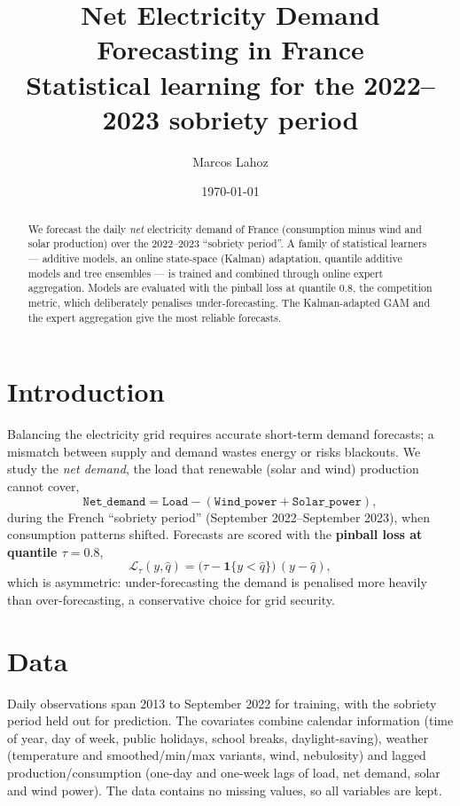 \documentclass[11pt,a4paper]{article}
\title{\textbf{Net Electricity Demand Forecasting in France}\\
\large Statistical learning for the 2022--2023 sobriety period}
\author{Marcos Lahoz}
\date{\today}
\begin{document}
\maketitle

\begin{abstract}
We forecast the daily \emph{net} electricity demand of France (consumption minus
wind and solar production) over the 2022--2023 ``sobriety period''. A family of
statistical learners --- additive models, an online state-space (Kalman) adaptation,
quantile additive models and tree ensembles --- is trained and combined through online
expert aggregation. Models are evaluated with the pinball loss at quantile $0.8$, the
competition metric, which deliberately penalises under-forecasting. The
Kalman-adapted GAM and the expert aggregation give the most reliable forecasts.
\end{abstract}

\section{Introduction}
Balancing the electricity grid requires accurate short-term demand forecasts; a
mismatch between supply and demand wastes energy or risks blackouts. We study the
\emph{net demand}, the load that renewable (solar and wind) production cannot cover,
\[
\texttt{Net\_demand} = \texttt{Load} - (\texttt{Wind\_power} + \texttt{Solar\_power}),
\]
during the French ``sobriety period'' (September 2022--September 2023), when consumption
patterns shifted. Forecasts are scored with the \textbf{pinball loss at quantile
$\tau=0.8$},
\[
\mathcal{L}_\tau(y,\hat q) = \big(\tau - \mathbf{1}\{y < \hat q\}\big)\,(y-\hat q),
\]
which is asymmetric: under-forecasting the demand is penalised more heavily than
over-forecasting, a conservative choice for grid security.

\section{Data}
Daily observations span 2013 to September 2022 for training, with the sobriety period
held out for prediction. The covariates combine calendar information (time of year,
day of week, public holidays, school breaks, daylight-saving), weather (temperature
and smoothed/min/max variants, wind, nebulosity) and lagged production/consumption
(one-day and one-week lags of load, net demand, solar and wind power). The data
contains no missing values, so all variables are kept.
\end{document}

